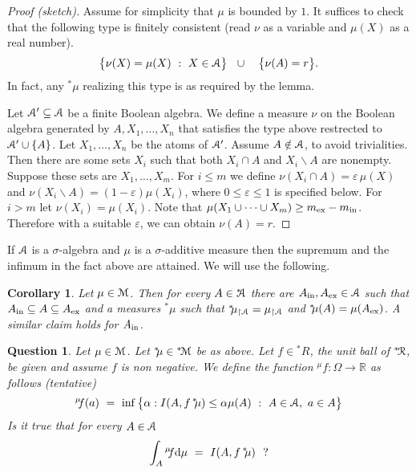 \documentclass[12pt,letterpaper,oneside,reqno]{amsart}
\theoremstyle{plain}
\newtheorem{corollary}[theorem]{Corollary}
\newtheorem{question}[theorem]{Question}
\theoremstyle{remark}
\begin{document}
\begin{proof}[Proof (sketch)]
Assume for simplicity that $\mu$ is bounded by $1$.
It suffices to check that the following type is finitely consistent (read $\nu$ as a variable and $\mu(X)$ as a real number).
$$
\big\{\nu(X)=\mu(X) \ :\ X\in{\EuScript A}\big\}
\ \ \cup\ \ \
\big\{\nu(A)=r\big\}.
$$
In fact, any ${}^{*\!\!}\mu$ realizing this type is as required by the lemma.

Let ${\EuScript A}'\subseteq{\EuScript A}$ be a finite Boolean algebra.
We define a measure $\nu$ on the Boolean algebra generated by $A,X_1,\dots,X_n$ that satisfies the type above restrected to ${\EuScript A}'\cup\{A\}$.
Let $X_1,\dots,X_n$ be the atoms of ${\EuScript A}'$.
Assume $A\notin{\EuScript A}$, to avoid trivialities.
Then there are some sets $X_i$ such that both $X_i\cap A$ and $X_i\smallsetminus A$ are nonempty.
Suppose these sets are $X_1,\dots,X_m$.
For $i\le m$ we define $\nu(X_i\cap A)=\varepsilon\,\mu(X)$ and $\nu(X_i\smallsetminus A)=(1-\varepsilon)\mu(X_i)$, where $0\le\varepsilon\le1$ is specified below.
For $i>m$ let $\nu(X_i)=\mu(X_i)$.
Note that $\mu(X_1\cup\dots\cup X_m)\ge m_{\rm ex}-m_{\rm in}$.
Therefore with a suitable $\varepsilon$, we can obtain $\nu(A)=r$.
\end{proof}

If ${\EuScript A}$ is a $\sigma$-algebra and $\mu$ is a $\sigma$-additive measure then the supremum and the infimum in the fact above are attained.
We will use the following.

\begin{corollary}
  Let $\mu\in{\EuScript M}$.
  Then for every $A\in{}^{*\!\!\!}{\EuScript A}$ there are $A_{\rm in},A_{\rm ex}\in{\EuScript A}$ such that $A_{\rm in}\subseteq A\subseteq A_{\rm ex}$ and a measures ${}^{*\!\!}\mu$ such that 
  ${}^{*\!\!}\mu_{\restriction{\EuScript A}}=\mu_{\restriction{\EuScript A}}$ and ${}^{*\!\!}\mu(A)=\mu(A_{\rm ex})$.  
  A similar claim holds for $A_{\rm in}$.
\end{corollary}

\begin{question}
  Let $\mu\in{\EuScript M}$.
  Let ${}^{*\!\!}\mu\in{}^{*\!}{\EuScript M}$ be as above.
  Let $f\in{}^{*\!\!}R$, the unit ball of ${}^{*\!}{\EuScript R}$, be given and assume $f$ is non negative.
  We define the function ${}^{\mu\!\!}f:\Omega\to{\mathds R}$ as follows (tentative)
  $$
  {}^{\mu\!\!}f(a)\ =\ \inf\big\{\alpha : I(A, f\,{}^{*\!\!}\mu)\le \alpha \mu(A) \ :\ A\in{\EuScript A},\ a\in A\big\}
  $$
  Is it true that for every $A\in{\EuScript A}$ 
  $$
  \int_A{}^{\mu\!\!}f{\rm d}\mu\ =\ I(A,f\,{}^{*\!\!}\mu)\ \ ?
  $$
\end{question}
\end{document}
